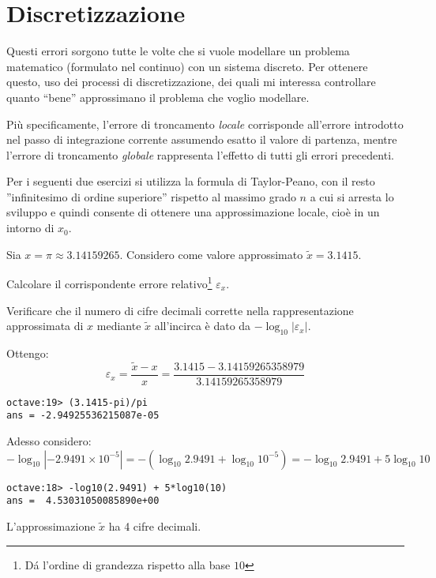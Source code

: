 \section{Discretizzazione} 

Questi errori sorgono tutte le volte che si vuole modellare un problema 
matematico (formulato nel continuo) con un sistema discreto. Per ottenere 
questo, uso dei processi di discretizzazione, dei quali mi interessa controllare
quanto ``bene'' approssimano il problema che voglio modellare.

Pi\`u specificamente, l'errore di troncamento \emph{locale} corrisponde 
all'errore introdotto nel passo di integrazione corrente assumendo esatto il 
valore di partenza, mentre l'errore di troncamento \emph{globale} rappresenta 
l'effetto di tutti gli errori precedenti.

Per i seguenti due esercizi si utilizza la formula di Taylor-Peano, con il 
resto ''infinitesimo di ordine superiore'' rispetto al massimo grado $n$ a cui 
si arresta lo sviluppo e quindi consente di ottenere una approssimazione
locale, cio\`e in un intorno di $x_{0}$.

\begin{exercise}[1.1]
	Sia $x = \pi \approx 3.14159265$. Considero come valore approssimato 
	$\tilde{x} = 3.1415$. 
	
	Calcolare il corrispondente errore relativo\footnote{D\'a l'ordine di 
	grandezza rispetto alla base $10$} $\varepsilon_{x}$. 
	
	Verificare che il numero di cifre decimali corrette nella rappresentazione 
	approssimata di $x$ mediante $\tilde{x}$ all'incirca \`e dato da $-\log_{10}
	{|\varepsilon_{x}|}$.
\end{exercise}
Ottengo:
\begin{displaymath}
	\varepsilon_{x} = \frac{\tilde{x}-x}{x} = \frac{3.1415-3.14159265358979}
	{3.14159265358979}
\end{displaymath}
\begin{lstlisting}
octave:19> (3.1415-pi)/pi
ans = -2.94925536215087e-05
\end{lstlisting}
Adesso considero:
\begin{equation*}
	-\log_{10}{|-2.9491 \times 10^{-5}|} = -\left (\log_{10}{2.9491} +
	\log_{10}{10^{-5}} \right ) = -\log_{10}{2.9491} + 5\log_{10}{10}
\end{equation*}
\begin{lstlisting}
octave:18> -log10(2.9491) + 5*log10(10)
ans =  4.53031050085890e+00
\end{lstlisting}
L'approssimazione $\tilde{x}$ ha 4 cifre decimali.

